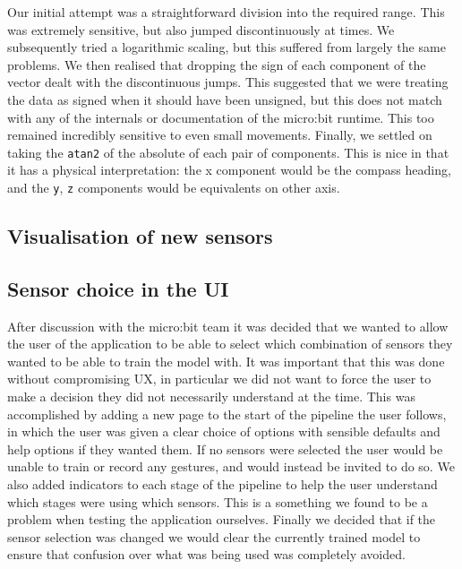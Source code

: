 \documentclass{article}
\begin{document}
Our initial attempt was a straightforward division into the required range. This was extremely sensitive, but also jumped discontinuously at times. We subsequently tried a logarithmic scaling, but this suffered from largely the same problems. We then realised that dropping the sign of each component of the vector dealt with the discontinuous jumps. This suggested that we were treating the data as signed when it should have been unsigned, but this does not match with any of the internals or documentation of the micro:bit runtime. This too remained incredibly sensitive to even small movements. Finally, we settled on taking the \verb|atan2| of the absolute of each pair of components. This is nice in that it has a physical interpretation: the x component would be the compass heading, and the \verb|y|, \verb|z| components would be equivalents on other axis.

\subsection{Visualisation of new sensors}%
\label{subsec:sensorvis}

\subsection{Sensor choice in the UI}%
\label{subsec:sensorchoice}
After discussion with the micro:bit team it was decided that we wanted to allow the user of the application to be able to select which combination of sensors they wanted to be able to train the model with. It was important that this was done without compromising UX, in particular we did not want to force the user to make a decision they did not necessarily understand at the time. This was accomplished by adding a new page to the start of the pipeline the user follows, in which the user was given a clear choice of options with sensible defaults and help options if they wanted them. If no sensors were selected the user would be unable to train or record any gestures, and would instead be invited to do so. We also added indicators to each stage of the pipeline to help the user understand which stages were using which sensors. This is a something we found to be a problem when testing the application ourselves. Finally we decided that if the sensor selection was changed we would clear the currently trained model to ensure that confusion over what was being used was completely avoided. \\

\end{document}

